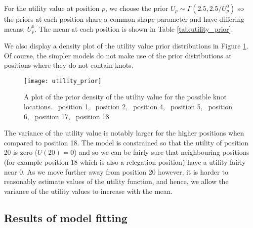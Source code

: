For the utility value at position \(p\), we choose the prior \(U_p \sim \Gamma(2.5, 2.5 / U^0_p)\) so the priors at each
position share a common shape parameter and have differing means, \(U^0_p\). The mean at each position is shown in Table
\ref{tab:utility_prior}.
\begin{table}
\centering
{}
\caption{\label{tab:utility_prior} The means of the \(\Gamma\) prior density for the utility value at the knot
positions \(p\) used within models \(m_0\), \(m_1\), \(m_2\), and \(m_3\)}
\end{table}
We also display a density plot of the utility value prior distributions in Figure \ref{fig:utility_prior}. Of course,
the simpler models do not make use of the prior distributions at positions where they do not contain knots. 
\begin{figure}[htp]
\begin{center}
\texttt{[image: utility\_prior]}
\caption{\label{fig:utility_prior} A plot of the prior density of the utility value for the possible knot locations.
\protect\redSolidLine\ position 1, \protect\greenSolidLine\ position 2, \protect\blueSolidLine\ position 4,
\protect\pinkSolidLine\ position 5, \protect\blackSolidLine\ position 6, \protect\greySolidLine\ position 17,
\protect\orangeSolidLine\ position 18} 
\end{center}
\end{figure}

The variance of the utility value is notably larger for the higher positions when compared to position 18. The model is
constrained so that the utility of position 20 is zero (\(U(20) = 0\)) and so we can be fairly sure that neighbouring
positions (for example position 18 which is also a relegation position) have a utility fairly near 0. As we move further
away from position 20 however, it is harder to reasonably estimate values of the utility function, and hence, we allow
the variance of the utility values to increase with the mean.

\subsection{Results of model fitting}
\label{sec:Model_inference_results1}

